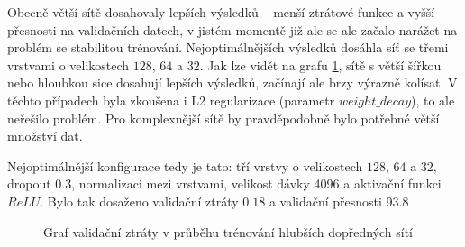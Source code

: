 Obecně větší sítě dosahovaly lepších výsledků – menší ztrátové funkce a vyšší
přesnosti na validačních datech, v jistém momentě již ale se ale začalo narážet
na problém se stabilitou trénování. Nejoptimálnějších výsledků dosáhla síť se
třemi vrstvami o velikostech $128$, $64$ a $32$. Jak lze vidět na grafu
\ref{graph:deepffnn}, sítě s větší šířkou nebo hloubkou sice dosahují lepších
výsledků, začínají ale brzy výrazně kolísat. V těchto případech byla zkoušena i
L2 regularizace (parametr $weight\_decay$), to ale neřešilo problém. Pro
komplexnější sítě by pravděpodobně bylo potřebné větší množství dat.

Nejoptimálnější konfigurace tedy je tato: tří vrstvy o velikostech $128$, $64$
a $32$, dropout $0.3$, normalizaci mezi vrstvami, velikost dávky 4096 a
aktivační funkci $ReLU$. Bylo tak dosaženo validační ztráty $0.18$ a validační
přesnosti 93.8%

\begin{figure}[]
    \centering
    \caption{Graf validační ztráty v průběhu trénování hlubších dopředných sítí }
    \label{graph:deepffnn}
\end{figure}

